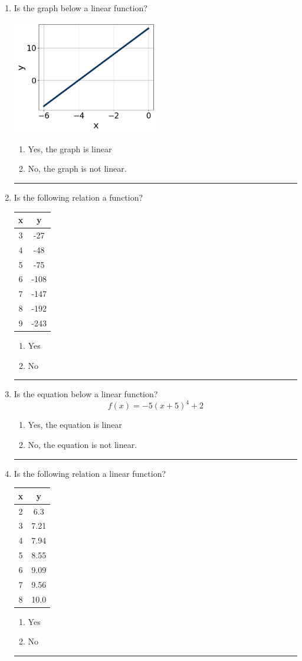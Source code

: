 \documentclass[14pt]{extbook}
\newcommand{\litem}[1]{\item#1\hspace*{-1cm}\rule{\textwidth}{0.4pt}}
\begin{document}
\begin{enumerate}
\litem{
Is the graph below a linear function?
\begin{center}
    \includegraphics[width=0.5\textwidth]{../Figures/MA_8_F_1_2_graphW.png}
\end{center}
\begin{enumerate}[label=\Alph*.]
\item Yes, the graph is linear
\item No, the graph is not linear.

\end{enumerate} }
\litem{
Is the following relation a function?

\begin{tabular}{c|c}
x &y\tabularnewline \hline
3 &-27\tabularnewline \hline
4 &-48\tabularnewline \hline
5 &-75\tabularnewline \hline
6 &-108\tabularnewline \hline
7 &-147\tabularnewline \hline
8 &-192\tabularnewline \hline
9 &-243\end{tabular}\begin{enumerate}[label=\Alph*.]
\item Yes
\item No

\end{enumerate} }
\litem{
Is the equation below a linear function?\[ f(x) = -5(x + 5)^4+2 \]\begin{enumerate}[label=\Alph*.]
\item Yes, the equation is linear
\item No, the equation is not linear.

\end{enumerate} }
\litem{
Is the following relation a linear function?

\begin{tabular}{c|c}
x &y\tabularnewline \hline
2 &6.3\tabularnewline \hline
3 &7.21\tabularnewline \hline
4 &7.94\tabularnewline \hline
5 &8.55\tabularnewline \hline
6 &9.09\tabularnewline \hline
7 &9.56\tabularnewline \hline
8 &10.0\end{tabular}\begin{enumerate}[label=\Alph*.]
\item Yes
\item No

\end{enumerate} }
\end{enumerate}
\end{document}
